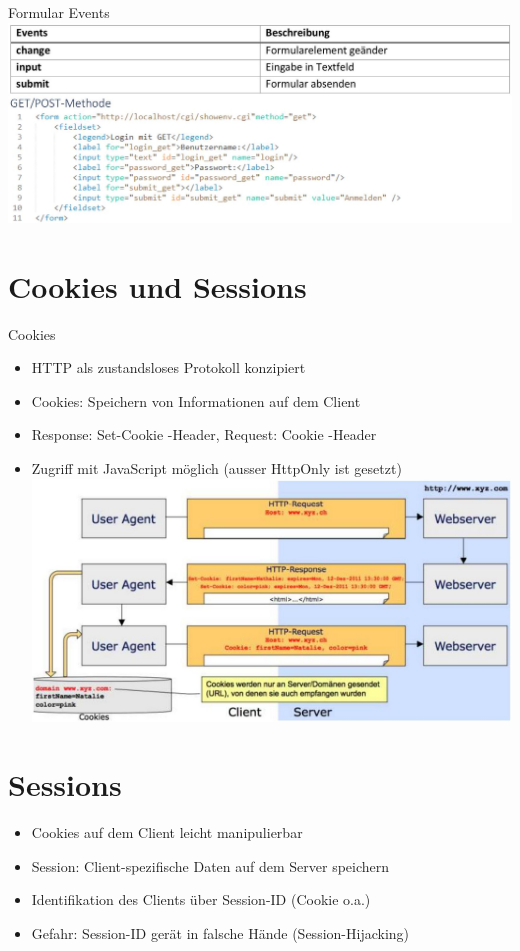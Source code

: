 \documentclass[10pt]{article}
\begin{document}
Formular Events\\
\includegraphics[max width=\textwidth, center]{2024_12_29_858f09cde51177c71657g-30}

\section*{Cookies und Sessions}
Cookies

\begin{itemize}
  \item HTTP als zustandsloses Protokoll konzipiert
  \item Cookies: Speichern von Informationen auf dem Client
  \item Response: Set-Cookie -Header, Request: Cookie -Header
  \item Zugriff mit JavaScript möglich (ausser HttpOnly ist gesetzt)\\
\includegraphics[max width=\textwidth, center]{2024_12_29_858f09cde51177c71657g-31}
\end{itemize}

\section*{Sessions}
\begin{itemize}
  \item Cookies auf dem Client leicht manipulierbar
  \item Session: Client-spezifische Daten auf dem Server speichern
  \item Identifikation des Clients über Session-ID (Cookie o.a.)
  \item Gefahr: Session-ID gerät in falsche Hände (Session-Hijacking)
\end{itemize}
\end{document}
